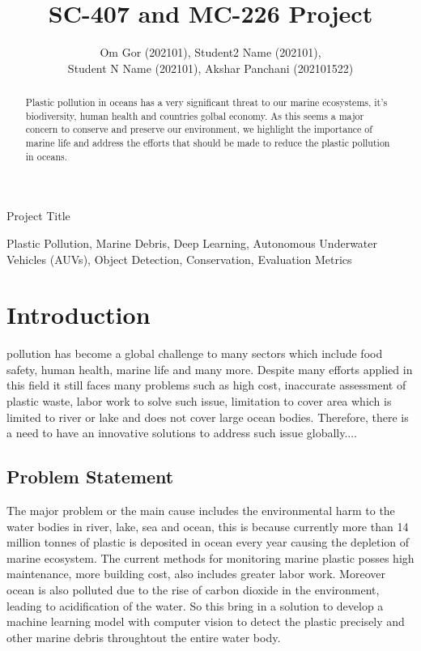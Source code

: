 \documentclass[lettersize,journal]{IEEEtran}
\begin{document}
\title{SC-407 and MC-226 Project}

\author{Om Gor (202101), Student2 Name (202101),\\ Student N Name (202101), Akshar Panchani (202101522)}

%
{Project Title}


\maketitle

\begin{abstract}
Plastic pollution in oceans has a very significant threat to our marine ecosystems, it's biodiversity, human health and countries golbal economy. As this seems a major concern to conserve and preserve our environment, we highlight the importance of marine life and address the efforts that should be made to reduce the plastic pollution in oceans. 
\end{abstract}

\begin{IEEEkeywords}
Plastic Pollution, Marine Debris, Deep Learning, Autonomous Underwater Vehicles (AUVs), Object Detection, Conservation, Evaluation Metrics
\end{IEEEkeywords}

\section{Introduction}
 pollution has become a global challenge to many sectors which include food safety, human health, marine life and many more. Despite many efforts applied in this field it still faces many problems such as high cost, inaccurate assessment of plastic waste, labor work to solve such issue, limitation to cover area which is limited to river or lake and does not cover large ocean bodies. Therefore, there is a need to have an innovative solutions to address such issue globally.$\ldots$

\subsection{Problem Statement}
The major problem or the main cause includes the environmental harm to the water bodies in river, lake, sea and ocean, this is because currently more than 14 million tonnes of plastic is deposited in ocean every year causing the depletion of marine ecosystem. The current methods for monitoring marine plastic posses high maintenance, more building cost, also includes greater labor work. Moreover ocean is also polluted due to the rise of carbon dioxide in the environment, leading to acidification of the water. So this bring in a solution to develop a machine learning model with computer vision to detect the plastic precisely and other marine debris throughtout the entire water body.
\end{document}

